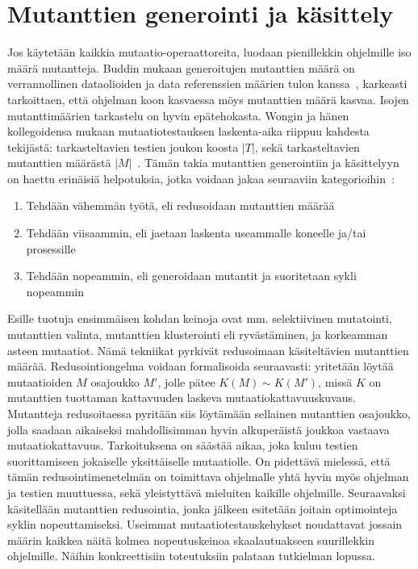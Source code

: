 \documentclass{tktltiki}
\begin{document}
\section{Mutanttien generointi ja käsittely}
Jos käytetään kaikkia mutaatio-operaattoreita, luodaan pienillekkin ohjelmille iso määrä mutantteja. Buddin mukaan generoitujen mutanttien määrä on verrannollinen dataolioiden ja data referenssien määrien tulon kanssa~\cite{Budd:1980:MAP:909408}, karkeasti tarkoittaen, että ohjelman koon kasvaessa möys mutanttien määrä kasvaa. Isojen mutanttimäärien tarkastelu on hyvin epätehokasta. Wongin ja hänen kollegoidensa mukaan mutaatiotestauksen laskenta-aika riippuu kahdesta tekijästä: tarkasteltavien testien joukon koosta $|T|$, sekä tarkasteltavien mutanttien määrästä $|M|$~\cite{}. Tämän takia mutanttien generointiin ja käsittelyyn on haettu erinäisiä helpotuksia, jotka voidaan jakaa seuraaviin kategorioihin~\cite{Hussain08}:
\begin{enumerate}
\item Tehdään vähemmän työtä, eli redusoidaan mutanttien määrää
\item Tehdään viisaammin, eli jaetaan laskenta useammalle koneelle ja/tai prosessille
\item Tehdään nopeammin, eli generoidaan mutantit ja suoritetaan sykli nopeammin
\end{enumerate}
Esille tuotuja ensimmäisen kohdan keinoja ovat mm. selektiivinen mutatointi, mutanttien valinta, mutanttien klusterointi eli ryvästäminen, ja korkeamman asteen mutaatiot. Nämä tekniikat pyrkivät redusoimaan käsiteltävien mutanttien määrää. Redusointiongelma voidaan formalisoida seuraavasti: yritetään löytää mutaatioiden $M$ osajoukko $M'$, jolle pätee $K(M) \sim K(M')$, missä $K$ on mutanttien tuottaman kattavuuden laskeva mutaatiokattavuuskuvaus. Mutantteja redusoitaessa pyritään siis löytämään sellainen mutanttien osajoukko, jolla saadaan aikaiseksi mahdollisimman hyvin alkuperäistä joukkoa vastaava mutaatiokattavuus. Tarkoituksena on säästää aikaa, joka kuluu testien suorittamiseen jokaiselle yksittäiselle mutaatiolle. On pidettävä mielessä, että tämän redusointimenetelmän on toimittava ohjelmalle yhtä hyvin myös ohjelman ja testien muuttuessa, sekä yleistyttävä mieluiten kaikille ohjelmille. Seuraavaksi käsitellään mutanttien redusointia, jonka jälkeen esitetään joitain optimointeja syklin nopeuttamiseksi. Useimmat mutaatiotestauskehykset noudattavat jossain määrin kaikkea näitä kolmea nopeutuskeinoa skaalautuakseen suurillekkin ohjelmille. Näihin konkreettisiin toteutuksiin palataan tutkielman lopussa.
\end{document}
